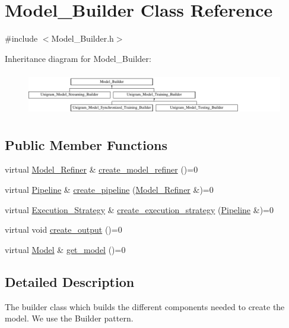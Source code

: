 \hypertarget{class_model___builder}{
\section{Model\_\-Builder Class Reference}
\label{class_model___builder}
}


{\ttfamily \#include $<$Model\_\-Builder.h$>$}

Inheritance diagram for Model\_\-Builder:\begin{figure}[H]
\begin{center}
\leavevmode
\includegraphics[height=1.91126cm]{class_model___builder}
\end{center}
\end{figure}
\subsection*{Public Member Functions}
\begin{DoxyCompactItemize}
\item 
virtual \hyperlink{class_model___refiner}{Model\_\-Refiner} \& \hyperlink{class_model___builder_abc7e4f108067afb34fb8c0fc305b06ea}{create\_\-model\_\-refiner} ()=0
\item 
virtual \hyperlink{class_pipeline}{Pipeline} \& \hyperlink{class_model___builder_a6818803bf65009076dd09dcd9bb9a0b8}{create\_\-pipeline} (\hyperlink{class_model___refiner}{Model\_\-Refiner} \&)=0
\item 
virtual \hyperlink{class_execution___strategy}{Execution\_\-Strategy} \& \hyperlink{class_model___builder_a52e9a4125b917b015f13c709ddef3a88}{create\_\-execution\_\-strategy} (\hyperlink{class_pipeline}{Pipeline} \&)=0
\item 
virtual void \hyperlink{class_model___builder_aab7de81c31d1a76e5427023b6cb95490}{create\_\-output} ()=0
\item 
virtual \hyperlink{class_model}{Model} \& \hyperlink{class_model___builder_a2cd7a2ce64bdc1377f6deee168e1bcd2}{get\_\-model} ()=0
\end{DoxyCompactItemize}


\subsection{Detailed Description}
The builder class which builds the different components needed to create the model. We use the Builder pattern.

